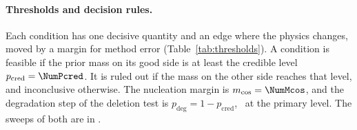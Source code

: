 \paragraph*{Thresholds and decision rules.}
Each condition has one decisive quantity and an edge where the physics changes, moved by a margin for method error (Table~\ref{tab:thresholds}). %
A condition is feasible if the prior mass on its good side is at least the credible level $p_\mathrm{cred}=\NumPcred$. %
It is ruled out if the mass on the other side reaches that level, and inconclusive otherwise. %
The nucleation margin is $m_{\cos}=\NumMcos$, and the degradation step of the deletion test is $p_\mathrm{deg}=1-p_\mathrm{cred}$, \NumPdeg\ at the primary level. %
The sweeps of both are in . %

